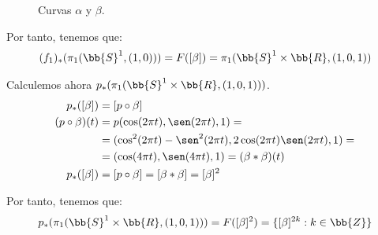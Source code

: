 \begin{ejemplo}
\begin{description}
\begin{description}
\begin{figure}[ht]
                \caption{Curvas $\alpha$ y $\beta$.}
                \label{fig:curvas_alpha_beta}
            \end{figure}


            Por tanto, tenemos que:
            \begin{gather*}
                (f_1)_*(\pi_1(\bb{S}^1,(1,0))) = F([\beta])= \pi_1(\bb{S}^1\times \bb{R},(1,0,1))
            \end{gather*}

            \item[Cálculo de $p_*(\pi_1(\bb{S}^1\times \bb{R},(1,0,1)))$:] Calculemos ahora $p_*(\pi_1(\bb{S}^1\times \bb{R},(1,0,1)))$.
            \begin{align*}
                p_*([\beta]) &= [p\circ \beta]\\
                (p\circ \beta)(t) &= p(\cos(2\pi t), \sen(2\pi t), 1) =\\&= (\cos^2(2\pi t) - \sen^2(2\pi t), 2\cos(2\pi t)\sen(2\pi t), 1) =\\&= (\cos(4\pi t), \sen(4\pi t), 1) = (\beta\ast\beta)(t)\\
                p_*([\beta]) &= [p\circ \beta] = [\beta\ast \beta] = [\beta]^2
            \end{align*}

            Por tanto, tenemos que:
            \begin{gather*}
                p_*(\pi_1(\bb{S}^1\times \bb{R},(1,0,1))) = F([\beta]^2) = \{[\beta]^{2k} : k\in \bb{Z}\}
            \end{gather*}
        \end{description}


\end{description}
\end{ejemplo}
